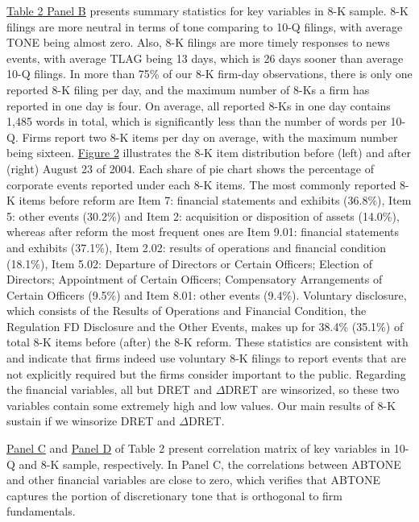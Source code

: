 \documentclass[a4paper]{article}
\begin{document}
\begin{spacing}{2}
\hyperref[T2PB]{Table 2 Panel B} presents summary statistics for key variables in 8-K sample. 8-K filings are more neutral in terms of tone comparing to 10-Q filings, with average TONE being almost zero. Also, 8-K filings are more timely responses to news events, with average TLAG being 13 days, which is 26 days sooner than average 10-Q filings. In more than 75\% of our 8-K firm-day observations, there is only one reported 8-K filing per day, and the maximum number of 8-Ks a firm has reported in one day is four. On average, all reported 8-Ks in one day contains 1,485 words in total, which is significantly less than the number of words per 10-Q. Firms report two 8-K items per day on average, with the maximum number being sixteen. \hyperref[fig2]{Figure 2} illustrates the 8-K item distribution before (left) and after (right) August 23 of 2004. Each share of pie chart shows the percentage of corporate events reported under each 8-K items. The most commonly reported 8-K items before reform are Item 7: financial statements and exhibits (36.8\%), Item 5: other events (30.2\%) and Item 2: acquisition or disposition of assets (14.0\%), whereas after reform the most frequent ones are Item 9.01: financial statements and exhibits (37.1\%), Item 2.02: results of operations and financial condition (18.1\%), Item 5.02: Departure of Directors or Certain Officers; Election of Directors; Appointment of Certain Officers; Compensatory Arrangements of Certain Officers (9.5\%) and Item 8.01: other events (9.4\%). Voluntary disclosure, which consists of the Results of Operations and Financial Condition, the Regulation FD Disclosure and the Other Events, makes up for 38.4\% (35.1\%) of total 8-K items before (after) the 8-K reform. These statistics are consistent with  and indicate that firms indeed use voluntary 8-K filings to report events that are not explicitly required but the firms consider important to the public. Regarding the financial variables, all but DRET and $\Delta$DRET are winsorized, so these two variables contain some extremely high and low values. Our main results of 8-K sustain if we winsorize DRET and $\Delta$DRET.

\hyperref[T2PC]{Panel C} and \hyperref[T2PD]{Panel D} of Table 2 present correlation matrix of key variables in 10-Q and 8-K sample, respectively. In Panel C, the correlations between ABTONE and other financial variables are close to zero, which verifies that ABTONE captures the portion of discretionary tone that is orthogonal to firm fundamentals. 


\end{spacing}
\end{document}
